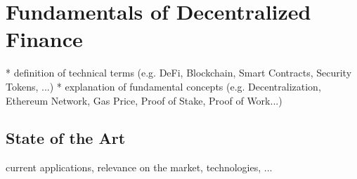 \chapter{Fundamentals of Decentralized Finance }
\label{cha:FundamentalsDecentralizedFinance}

* definition of technical terms (e.g. DeFi, Blockchain, Smart Contracts, Security Tokens, ...)
* explanation of fundamental concepts (e.g. Decentralization, Ethereum Network, Gas Price, Proof of Stake, Proof of Work...)

\section{State of the Art}
current applications, relevance on the market, technologies, ...